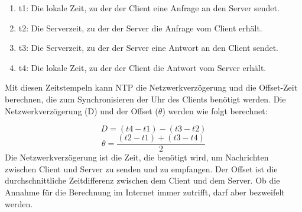 \documentclass[../vs-script-first-v01.tex]{subfiles}
\begin{document}
\begin{enumerate}
\item t1: Die lokale Zeit, zu der der Client eine Anfrage an den Server sendet.
\item t2: Die Serverzeit, zu der der Server die Anfrage vom Client erhält.
\item t3: Die Serverzeit, zu der der Server eine Antwort an den Client sendet.
\item t4: Die lokale Zeit, zu der der Client die Antwort vom Server erhält.
\end{enumerate}
Mit diesen Zeitstempeln kann NTP die Netzwerkverzögerung und die Offset-Zeit berechnen, die zum Synchronisieren der Uhr des Clients benötigt werden. Die Netzwerkverzögerung (D) und der Offset (\(\theta\)) werden wie folgt berechnet:

\[ D = (t4 - t1) - (t3 - t2) \]
\[ \theta = \frac{(t2 - t1) + (t3 - t4)}{2} \]
Die Netzwerkverzögerung ist die Zeit, die benötigt wird, um Nachrichten zwischen Client und Server zu senden und zu empfangen. Der Offset ist die durchschnittliche Zeitdifferenz zwischen dem Client und dem Server. Ob die Annahme für die Berechnung im Internet immer zutrifft, darf aber bezweifelt werden.
\end{document}
